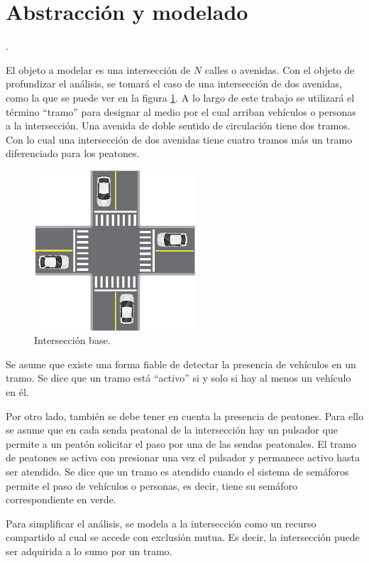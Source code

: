 \lstset {
	columns=flexible,
	tabsize=4
}

\section{Abstracción y modelado}.

	El objeto a modelar es una intersección de $N$ calles o avenidas.
	Con el objeto de profundizar el análisis, se tomará el caso de una intersección de dos avenidas, como la que se puede ver en la figura \ref{fig:interseccion-base}.
	A lo largo de este trabajo se utilizará el término \enquote{tramo} para designar al medio por el cual arriban vehículos o personas a la intersección.
	Una avenida de doble sentido de circulación tiene dos tramos.
	Con lo cual una intersección de dos avenidas tiene cuatro tramos más un tramo diferenciado para los peatones.

	\begin{figure}[htbp]
		\centering
		\includegraphics[width=6cm]{imagenes/interseccion-base.eps}
		\caption{Intersección base.}
		\label{fig:interseccion-base}
	\end{figure}

	Se asume que existe una forma fiable de detectar la presencia de vehículos en un tramo.
	Se dice que un tramo está \enquote{activo} si y solo si hay al menos un vehículo en él.

	Por otro lado, también se debe tener en cuenta la presencia de peatones.
	Para ello se asume que en cada senda peatonal de la intersección hay un pulsador que permite a un peatón solicitar el paso por una de las sendas peatonales.
	El tramo de peatones se activa con presionar una vez el pulsador y permanece activo hasta ser atendido.
	Se dice que un tramo es atendido cuando el sistema de semáforos permite el paso de vehículos o personas, es decir, tiene su semáforo correspondiente en verde.

	Para simplificar el análisis, se modela a la intersección como un recurso compartido al cual se accede con exclusión mutua.
	Es decir, la intersección puede ser adquirida a lo sumo por un tramo.



